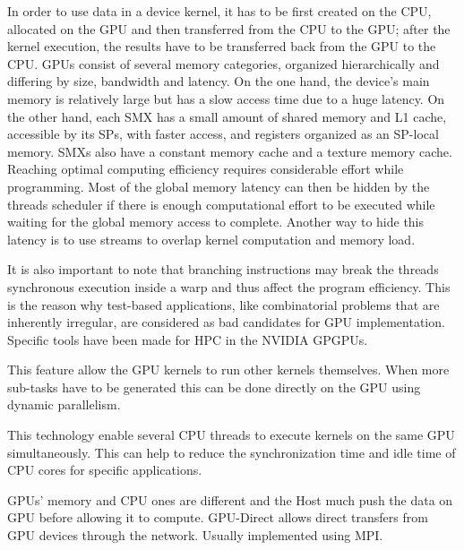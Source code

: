 In order to use data in a device kernel, it has to be first created on the CPU, allocated on the GPU and then transferred from the CPU to the GPU; after the kernel execution, the results have to be transferred back from the GPU to the CPU. 
GPUs consist of several memory categories, organized hierarchically and differing by size, bandwidth and latency.   
On the one hand, the device's main memory is relatively large but has a slow access time due to a huge latency. 
On the other hand, each SMX has a small amount of shared memory and L1 cache, accessible by its SPs, with faster access, and registers organized as an SP-local memory. 
SMXs also have a constant memory cache and a texture memory cache.
Reaching optimal computing efficiency requires considerable effort while programming.
Most of the global memory latency can then be hidden by the threads scheduler if there is enough computational effort to be executed while waiting for the global memory access to complete. Another way to hide this latency is to use streams to overlap kernel computation and memory load. 

It is also important to note that branching instructions may break the threads synchronous execution inside a warp and thus affect the program efficiency. 
This is the reason why test-based applications, like combinatorial problems that are inherently irregular, are considered as bad candidates for GPU implementation.\\ 

Specific tools have been made for HPC in the NVIDIA GPGPUs. 
\begin{description}
  \item[Dynamic Parallelism] This feature allow the GPU kernels to run other kernels themselves. When more sub-tasks have to be generated this can be done directly on the GPU using dynamic parallelism.
  \item[Hyper-Q] This technology enable several CPU threads to execute kernels on the same GPU simultaneously. This can help to reduce the synchronization time and idle time of CPU cores for specific applications.
  \item[NVIDIA GPU-Direct] GPUs' memory and CPU ones are different and the Host much push the data on GPU before allowing it to compute. GPU-Direct allows direct transfers from GPU devices through the network. Usually implemented using MPI.  
\end{description}


